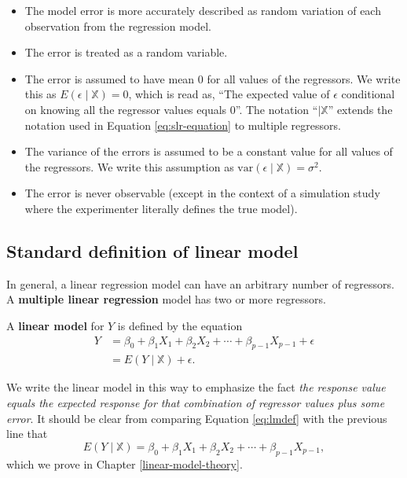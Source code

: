 \documentclass[
]{book}
\providecommand{\tightlist}{%
  \setlength{\itemsep}{0pt}\setlength{\parskip}{0pt}}
\theoremstyle{definition}
\theoremstyle{definition}
\theoremstyle{definition}
\theoremstyle{definition}
\theoremstyle{remark}
\begin{document}
\begin{itemize}
  \begin{itemize}
  \tightlist
  \item
    The model error is more accurately described as random variation of each observation from the regression model.
  \item
    The error is treated as a random variable.
  \item
    The error is assumed to have mean 0 for all values of the regressors. We write this as \(E(\epsilon \mid \mathbb{X}) = 0\), which is read as, ``The expected value of \(\epsilon\) conditional on knowing all the regressor values equals 0''. The notation ``\(\mid \mathbb{X}\)'' extends the notation used in Equation \eqref{eq:slr-equation} to multiple regressors.
  \item
    The variance of the errors is assumed to be a constant value for all values of the regressors. We write this assumption as \(\mathrm{var}(\epsilon \mid \mathbb{X})=\sigma^2\).
  \item
    The error is never observable (except in the context of a simulation study where the experimenter literally defines the true model).
  \end{itemize}
\end{itemize}

\hypertarget{standard-definition-of-linear-model}{%
\subsection{Standard definition of linear model}\label{standard-definition-of-linear-model}}

In general, a linear regression model can have an arbitrary number of regressors. A \textbf{multiple linear regression} model has two or more regressors.

A \textbf{linear model} for \(Y\) is defined by the equation
\[
\begin{aligned}
Y &= \beta_0 + \beta_1 X_1 + \beta_2 X_2 + \cdots + \beta_{p-1}
X_{p-1} + \epsilon \\
&= E(Y \mid \mathbb{X}) + \epsilon.
\end{aligned}
\label{eq:lmdef}
\]

We write the linear model in this way to emphasize the fact \emph{the response value equals the expected response for that combination of regressor values plus some error}. It should be clear from comparing Equation \eqref{eq:lmdef} with the previous line that
\[
E(Y \mid \mathbb{X}) = \beta_0 + \beta_1 X_1 + \beta_2 X_2 + \cdots + \beta_{p-1} X_{p-1},
\]
which we prove in Chapter \ref{linear-model-theory}.
\end{document}
